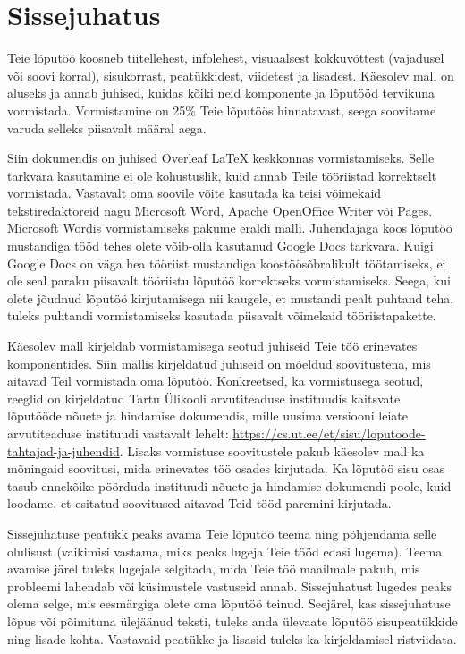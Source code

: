 \section{Sissejuhatus} \label{sissejuhatus}

Teie lõputöö koosneb tiitellehest, infolehest, visuaalsest kokkuvõttest (vajadusel või soovi korral), sisukorrast, peatükkidest, viidetest ja lisadest. Käesolev mall on aluseks ja annab juhised, kuidas kõiki neid komponente ja lõputööd tervikuna vormistada. Vormistamine on 25\% Teie lõputöös hinnatavast, seega soovitame varuda selleks piisavalt määral aega.

Siin dokumendis on juhised Overleaf LaTeX keskkonnas vormistamiseks. Selle tarkvara kasutamine ei ole kohustuslik, kuid annab Teile tööriistad korrektselt vormistada. Vastavalt oma soovile võite kasutada ka teisi võimekaid tekstiredaktoreid nagu Microsoft Word, Apache OpenOffice Writer või Pages. Microsoft Wordis vormistamiseks pakume eraldi malli. Juhendajaga koos lõputöö mustandiga tööd tehes olete võib-olla kasutanud Google Docs tarkvara. Kuigi Google Docs on väga hea tööriist mustandiga koostöösõbralikult töötamiseks, ei ole seal paraku piisavalt tööriistu lõputöö korrektseks vormistamiseks. Seega, kui olete jõudnud lõputöö kirjutamisega nii kaugele, et mustandi pealt puhtand teha, tuleks puhtandi vormistamiseks kasutada piisavalt võimekaid tööriistapakette.

Käesolev mall kirjeldab vormistamisega seotud juhiseid Teie töö erinevates komponentides. Siin mallis kirjeldatud juhiseid on mõeldud soovitustena, mis aitavad Teil vormistada oma lõputöö. Konkreetsed, ka vormistusega seotud, reeglid on kirjeldatud Tartu Ülikooli arvutiteaduse instituudis kaitsvate lõputööde nõuete ja hindamise dokumendis, mille uusima versiooni leiate arvutiteaduse instituudi vastavalt lehelt: \url{https://cs.ut.ee/et/sisu/loputoode-tahtajad-ja-juhendid}.
Lisaks vormistuse soovitustele pakub käesolev mall ka mõningaid soovitusi, mida erinevates töö osades kirjutada. Ka lõputöö sisu osas tasub ennekõike pöörduda instituudi nõuete ja hindamise dokumendi poole, kuid loodame, et esitatud soovitused aitavad Teid tööd paremini kirjutada.

Sissejuhatuse peatükk peaks avama Teie lõputöö teema ning põhjendama selle olulisust (vaikimisi vastama, miks peaks lugeja Teie tööd edasi lugema). Teema avamise järel tuleks lugejale selgitada, mida Teie töö maailmale pakub, mis probleemi lahendab või küsimustele vastuseid annab. Sissejuhatust lugedes peaks olema selge, mis eesmärgiga olete oma lõputöö teinud. Seejärel, kas sissejuhatuse lõpus või põimituna ülejäänud teksti, tuleks anda ülevaate lõputöö sisupeatükkide ning lisade kohta. Vastavaid peatükke ja lisasid tuleks ka kirjeldamisel ristviidata.

